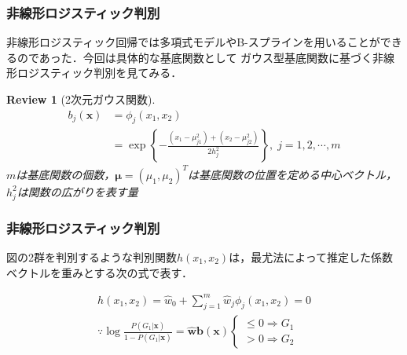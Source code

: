\documentclass[dvipdfmx,cjk]{beamer}
\theoremstyle{example}
\newtheorem{review}[thm]{Review}
\begin{document}
\begin{frame}
    \frametitle{非線形ロジスティック判別}
    非線形ロジスティック回帰では多項式モデルやB-スプラインを用いることができるのであった．今回は具体的な基底関数として
    ガウス型基底関数に基づく非線形ロジスティック判別を見てみる．
    \begin{review}[2次元ガウス関数]
        \begin{align*}
            b_j(\boldsymbol{x}) & =\phi_j(x_1,x_2)                                                                          \\
                                & =\exp\left\{-\frac{(x_1-\mu_{j1}^2)+(x_2-\mu_{j2}^2)}{2h_j^2}\right\}, \; j=1,2,\cdots ,m
        \end{align*}
        $m$は基底関数の個数，$\boldsymbol{\mu}=(\mu_1,\mu_2)^T$は基底関数の位置を定める中心ベクトル，$h_j^2$は関数の広がりを表す量
    \end{review}
\end{frame}
\begin{frame}
    \frametitle{非線形ロジスティック判別}
    図の2群を判別するような判別関数$h(x_1,x_2)$は，最尤法によって推定した係数ベクトルを重みとする次の式で表す．

    \begin{align*}
        h(x_1,x_2)=\hat{w}_0+\sum_{j=1}^{m}\hat{w}_j\phi_j(x_1,x_2)=0 \\
        \because \log \frac{P(G_1|\boldsymbol{x})}{1-P(G_1|\boldsymbol{x})}=\hat{\boldsymbol{w}}\boldsymbol{b}(\boldsymbol{x})
        \begin{cases}
            \leq 0 \Rightarrow G_1 \\
            > 0 \Rightarrow G_2
        \end{cases}
    \end{align*}
\end{frame}
\end{document}
